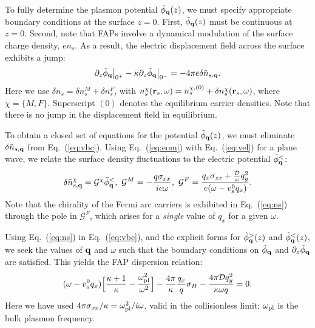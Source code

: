 \documentclass[aps,twocolumn,prl,groupedaddress]{revtex4}
\newcommand{\be}{\begin{equation}}
\newcommand{\ee}{\end{equation}}
\renewcommand{\vec}[1]{{\bf #1}}
\begin{document}
To fully determine the plasmon potential $\tilde{\phi}_{\vec{q}}(z)$, we must specify appropriate boundary conditions at the surface $z =0$.
First, $\tilde{\phi}_{\vec{q}}(z)$ must be continuous at $z=0$. 
Second, note that FAPs involve a dynamical 
modulation of the surface charge density, $en_s$. 
As a result, the electric displacement field across the surface exhibits a jump:
\be
\partial_z \tilde{\phi}_{\vec{q}}\big|_{0^+}  -  \kappa\partial_z \tilde{\phi}_{\vec{q}} \big|_{0^-} =  -4\pi e \delta \tilde{n}_{s,\vec{q}}. 
\label{eq:vbc}
\ee 
Here we use $\delta n_s  = \delta n_s^M + \delta n_s^F$, with $n^\chi_s(\vec{r}_s, \omega) = n_s^{\chi, (0)} + \delta n_s^{\chi}(\vec{r}_s, \omega)$, where $\chi = \{M, F\}$.
Superscript $(0)$ denotes the equilibrium carrier densities. Note that there is no jump in the displacement field in equilibrium.

To obtain a closed set of equations for the potential $\tilde\phi_{\vec{q}}(z)$, we must eliminate $\delta \tilde{n}_{s,\vec{q}}$ from Eq.~(\ref{eq:vbc}). Using Eq.~(\ref{eq:eom}) with Eq.~(\ref{eq:vel}) for a plane wave, we relate the surface density fluctuations to the electric potential $\tilde \phi_{\vec{q}}^<$:
\be
\delta \tilde n_{s,\vec{q}}^{\chi} = \mathcal{G}^{\chi} \tilde \phi_{\vec{q}}^{<}, \ \mathcal{G}^M=  - \frac{q \sigma_{xx}}{i e\omega}, \  \mathcal{G}^F =  \frac{q_x \sigma_{zx} + \tfrac{\mathcal{D}}{\omega} q_y^2 }{ e( \omega - v_s^0 q_x)}.
\label{eq:ns}
\ee
Note that the chirality of the Fermi arc carriers is exhibited in Eq.~(\ref{eq:ns}) through the pole in $\mathcal{G}^F$, 
which arises for a {\it single} value of $q_x$ for a given $\omega$.

Using Eq.~(\ref{eq:ns}) in Eq.~(\ref{eq:vbc}), and the explicit forms for $\tilde\phi_{\vec{q}}^>(z)$ and  $\tilde\phi_{\vec{q}}^<(z)$, we seek the values of $\vec{q}$ and $\omega$ such that the boundary conditions on $\tilde\phi_{\vec{q}}$ and $\partial_z\tilde\phi_{\vec{q}}$ are satisfied. This yields the FAP dispersion relation: 
\be
(\omega - v_s^0 q_x)\Big[\frac{\kappa+1}{\kappa} - \frac{\omega_{\rm pl}^2}{\omega^2}\Big] - \frac{4\pi}{\kappa} \frac{q_x}{q}\sigma_H - \frac{4\pi \mathcal{D} q_y^2}{\kappa \omega q}=0.
\label{eq:decoupledsecular}
\ee
Here we have 
used 
 $4\pi\sigma_{xx}/\kappa = {\omega}_{\rm pl}^2/i\omega$, valid in the collisionless limit; $\omega_{\rm pl}$ is the bulk plasmon frequency.
\end{document}
